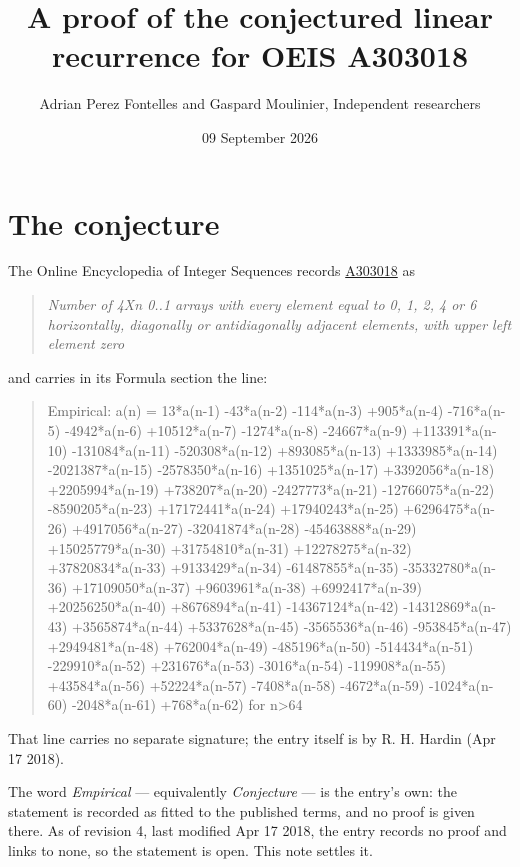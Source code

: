 \documentclass[11pt]{article}
\title{A proof of the conjectured linear recurrence for OEIS A303018}
\author{Adrian Perez Fontelles and Gaspard Moulinier, Independent researchers}
\date{09 September 2026}
\theoremstyle{definition}
\begin{document}
\maketitle
\section{The conjecture}

The Online Encyclopedia of Integer Sequences records \href{https://oeis.org/A303018}{A303018} as

\begin{quote}\itshape Number of 4Xn 0..1 arrays with every element equal to 0, 1, 2, 4 or 6 horizontally, diagonally or antidiagonally adjacent elements, with upper left element zero\end{quote}

and carries in its Formula section the line:

\begin{quote}\ttfamily Empirical: a(n) = 13*a(n-1) -43*a(n-2) -114*a(n-3) +905*a(n-4) -716*a(n-5) -4942*a(n-6) +10512*a(n-7) -1274*a(n-8) -24667*a(n-9) +113391*a(n-10) -131084*a(n-11) -520308*a(n-12) +893085*a(n-13) +1333985*a(n-14) -2021387*a(n-15) -2578350*a(n-16) +1351025*a(n-17) +3392056*a(n-18) +2205994*a(n-19) +738207*a(n-20) -2427773*a(n-21) -12766075*a(n-22) -8590205*a(n-23) +17172441*a(n-24) +17940243*a(n-25) +6296475*a(n-26) +4917056*a(n-27) -32041874*a(n-28) -45463888*a(n-29) +15025779*a(n-30) +31754810*a(n-31) +12278275*a(n-32) +37820834*a(n-33) +9133429*a(n-34) -61487855*a(n-35) -35332780*a(n-36) +17109050*a(n-37) +9603961*a(n-38) +6992417*a(n-39) +20256250*a(n-40) +8676894*a(n-41) -14367124*a(n-42) -14312869*a(n-43) +3565874*a(n-44) +5337628*a(n-45) -3565536*a(n-46) -953845*a(n-47) +2949481*a(n-48) +762004*a(n-49) -485196*a(n-50) -514434*a(n-51) -229910*a(n-52) +231676*a(n-53) -3016*a(n-54) -119908*a(n-55) +43584*a(n-56) +52224*a(n-57) -7408*a(n-58) -4672*a(n-59) -1024*a(n-60) -2048*a(n-61) +768*a(n-62) for n>64\end{quote}

That line carries no separate signature; the entry itself is by R. H. Hardin (Apr 17 2018).

The word {\itshape Empirical} --- equivalently {\itshape Conjecture} --- is the entry's own: the statement is recorded as fitted to the published terms, and no proof is given there. As of revision 4, last modified Apr 17 2018, the entry records no proof and links to none, so the statement is open. This note settles it.
\end{document}
